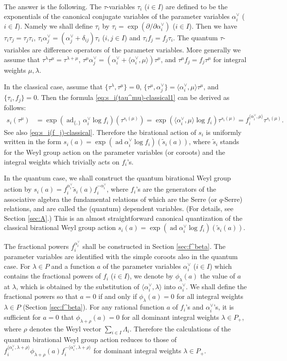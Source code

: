 \documentclass[12pt,twoside]{article}
\newcommand\bra{\langle}
\newcommand\ket{\rangle}
\newcommand\ad{\mathop{\mathrm{ad}}\nolimits}
\newcommand\av{\alpha^\vee}
\newcommand\ts{{\tilde s}}
\renewcommand\d{\partial}
\theoremstyle{plain} %
\theoremstyle{definition} %
\theoremstyle{definition} %
\numberwithin{theorem}{section}
\numberwithin{equation}{section}
\numberwithin{figure}{section}
\numberwithin{table}{section}
\newcommand\secref[1]{Section \ref{#1}}
\begin{document}
The answer is the following. 
The $\tau$-variables $\tau_i$ ($i\in I$) are defined 
to be the exponentials of the canonical conjugate variables 
of the parameter variables $\av_i$ ($i\in I$).
Namely we shall define $\tau_i$ by $\tau_i = \exp(\d/\d\av_i)$ ($i\in I$). 
Then we have $\tau_i\tau_j=\tau_j\tau_i$, $\tau_i\av_j=(\av_j+\delta_{ij})\tau_i$ ($i,j\in I$)
and $\tau_i f_j = f_j \tau_i$.
The quantum $\tau$-variables are difference operators 
of the parameter variables.
More generally we assume that $\tau^\lambda\tau^\mu=\tau^{\lambda+\mu}$, 
$\tau^\mu\av_j=(\av_i+\bra\av_i,\mu\ket)\tau^\mu$,
and $\tau^\mu f_j=f_j\tau^\mu$
for integral weights $\mu,\lambda$.

In the classical case, 
assume that $\{\tau^\lambda,\tau^\mu\}=0$,
$\{\tau^\mu,\av_j\}=\bra\av_i,\mu\ket\tau^\mu$, and $\{\tau_i,f_j\}=0$.
Then the formula \eqref{eq:s_i(tau^mu)-classical1} can be derived as follows: 
\begin{align}
 s_i(\tau^\mu) 
 &
 = \exp(\ad_{\{,\}} \av_i \log f_i)(\tau^{s_i(\mu)})
 = \exp(\bra\av_i,\mu\ket \log f_i)\tau^{s_i(\mu)}
 = f_i^{\bra\av_i,\mu\ket}\tau^{s_i(\mu)}.
 \label{eq:s_i(tau^mu)-classical2}
\end{align}
See also \eqref{eq:s_i(f_j)-classical}.
Therefore the birational action of $s_i$ is uniformly written in the form 
$s_i(a) = \exp(\ad \av_i\log f_i)(\ts_i(a))$,
where $\ts_i$ stands for the Weyl group action on the parameter variables
(or coroots) and the integral weights which trivially acts on $f_i$'s.

In the quantum case, we shall construct the quantum birational Weyl group action by
$s_i(a)=f_i^{\av_i} \ts_i(a) f_i^{-\av_i}$, 
where $f_i$'s are the generators of 
the associative algebra the fundamental relations of which
are the Serre (or $q$-Serre) relations,
and are called the (quantum) dependent variables.
(For details, see \secref{sec:A}.)
This is an almost straightforward canonical quantization 
of the classical birational Weyl group action $s_i(a) = \exp(\ad \av_i\log f_i)(\ts_i(a))$.

The fractional powers $f_i^{\av_i}$ shall be constructed in \secref{sec:f^beta}.
The parameter variables are identified with the simple coroots also in the quantum case. 
For $\lambda\in P$ and a function $a$ of the parameter variables $\av_i$ ($i\in I$) 
which contains the fractional powers of $f_i$ ($i\in I$), 
we denote by $\phi_\lambda(a)$ the value of $a$ at $\lambda$, 
which is obtained by the substitution of $\bra\av_i,\lambda\ket$ into $\av_i$.
We shall define the fractional powers so that $a=0$ if and only if $\phi_\lambda(a)=0$
for all integral weights $\lambda\in P$ (\secref{sec:f^beta}).
For any rational function $a$ of $f_i$'s and $\av_i$'s,
it is sufficient for $a=0$ that $\phi_{\lambda+\rho}(a)=0$ 
for all dominant integral weights $\lambda\in P_+$,
where $\rho$ denotes the Weyl vector $\sum_{i\in I}\Lambda_i$.
Therefore the calculations of the quantum birational Weyl group action
reduces to those of 
$f_i^{\bra\av_i,\lambda+\rho\ket} \phi_{\lambda+\rho}(a) f_i^{-\bra\av_i,\lambda+\rho\ket}$ 
for dominant integral weights $\lambda\in P_+$.
\end{document}
